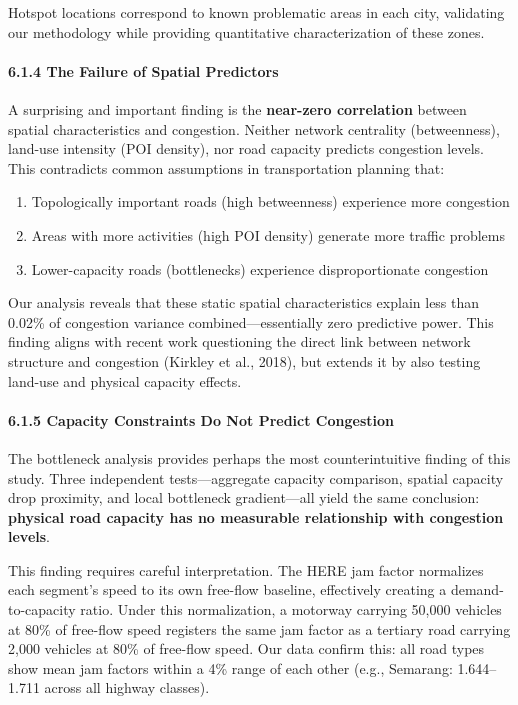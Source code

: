 \documentclass[
  12pt,
]{article}
\providecommand{\tightlist}{%
  \setlength{\itemsep}{0pt}\setlength{\parskip}{0pt}}
\begin{document}
Hotspot locations correspond to known problematic areas in each city, validating our methodology while providing quantitative characterization of these zones.

\paragraph{6.1.4 The Failure of Spatial Predictors}\label{the-failure-of-spatial-predictors}

A surprising and important finding is the \textbf{near-zero correlation} between spatial characteristics and congestion. Neither network centrality (betweenness), land-use intensity (POI density), nor road capacity predicts congestion levels. This contradicts common assumptions in transportation planning that:

\begin{enumerate}
\def\labelenumi{\arabic{enumi}.}
\tightlist
\item
  Topologically important roads (high betweenness) experience more congestion
\item
  Areas with more activities (high POI density) generate more traffic problems
\item
  Lower-capacity roads (bottlenecks) experience disproportionate congestion
\end{enumerate}

Our analysis reveals that these static spatial characteristics explain less than 0.02\% of congestion variance combined---essentially zero predictive power. This finding aligns with recent work questioning the direct link between network structure and congestion (Kirkley et al., 2018), but extends it by also testing land-use and physical capacity effects.

\paragraph{6.1.5 Capacity Constraints Do Not Predict Congestion}\label{capacity-constraints-do-not-predict-congestion}

The bottleneck analysis provides perhaps the most counterintuitive finding of this study. Three independent tests---aggregate capacity comparison, spatial capacity drop proximity, and local bottleneck gradient---all yield the same conclusion: \textbf{physical road capacity has no measurable relationship with congestion levels}.

This finding requires careful interpretation. The HERE jam factor normalizes each segment's speed to its own free-flow baseline, effectively creating a demand-to-capacity ratio. Under this normalization, a motorway carrying 50,000 vehicles at 80\% of free-flow speed registers the same jam factor as a tertiary road carrying 2,000 vehicles at 80\% of free-flow speed. Our data confirm this: all road types show mean jam factors within a 4\% range of each other (e.g., Semarang: 1.644--1.711 across all highway classes).
\end{document}
